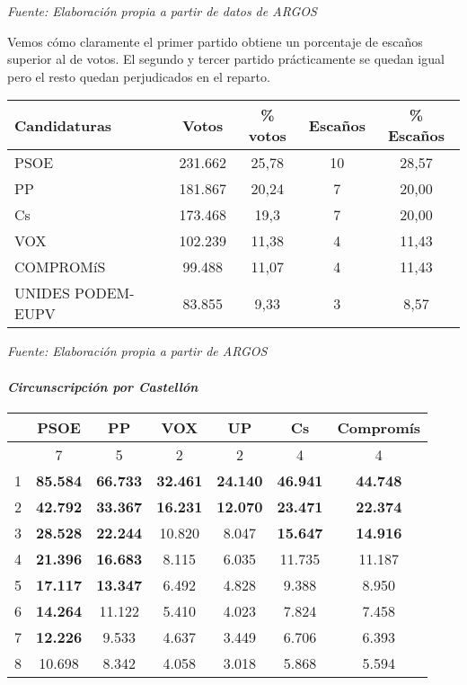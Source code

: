 \documentclass[
]{article}
\begin{document}
\emph{Fuente: Elaboración propia a partir de datos de ARGOS}

Vemos cómo claramente el primer partido obtiene un porcentaje de escaños
superior al de votos. El segundo y tercer partido prácticamente se
quedan igual pero el resto quedan perjudicados en el reparto.

\begin{longtable}[]{@{}lcccc@{}}
\toprule\noalign{}
\textbf{Candidaturas} & \textbf{Votos} & \textbf{\% votos} &
\textbf{Escaños} & \textbf{\% Escaños} \\
\midrule\noalign{}
\endhead
\bottomrule\noalign{}
\endlastfoot
PSOE & 231.662 & 25,78 & 10 & 28,57 \\
PP & 181.867 & 20,24 & 7 & 20,00 \\
Cs & 173.468 & 19,3 & 7 & 20,00 \\
VOX & 102.239 & 11,38 & 4 & 11,43 \\
COMPROMíS & 99.488 & 11,07 & 4 & 11,43 \\
UNIDES PODEM-EUPV & 83.855 & 9,33 & 3 & 8,57 \\
\end{longtable}

\emph{Fuente: Elaboración propia a partir de ARGOS}

\hypertarget{circunscripciuxf3n-por-castelluxf3n}{%
\paragraph{\texorpdfstring{\textbf{\emph{Circunscripción por
Castellón}}}{Circunscripción por Castellón}}\label{circunscripciuxf3n-por-castelluxf3n}}

\begin{longtable}[]{@{}lcccccc@{}}
\toprule\noalign{}
& \textbf{PSOE} & \textbf{PP} & \textbf{VOX} & \textbf{UP} & \textbf{Cs}
& \textbf{Compromís} \\
\midrule\noalign{}
\endhead
\bottomrule\noalign{}
\endlastfoot
24 & 7 & 5 & 2 & 2 & 4 & 4 \\
1 & \textbf{85.584} & \textbf{66.733} & \textbf{32.461} &
\textbf{24.140} & \textbf{46.941} & \textbf{44.748} \\
2 & \textbf{42.792} & \textbf{33.367} & \textbf{16.231} &
\textbf{12.070} & \textbf{23.471} & \textbf{22.374} \\
3 & \textbf{28.528} & \textbf{22.244} & 10.820 & 8.047 & \textbf{15.647}
& \textbf{14.916} \\
4 & \textbf{21.396} & \textbf{16.683} & 8.115 & 6.035 & 11.735 &
11.187 \\
5 & \textbf{17.117} & \textbf{13.347} & 6.492 & 4.828 & 9.388 & 8.950 \\
6 & \textbf{14.264} & 11.122 & 5.410 & 4.023 & 7.824 & 7.458 \\
7 & \textbf{12.226} & 9.533 & 4.637 & 3.449 & 6.706 & 6.393 \\
8 & 10.698 & 8.342 & 4.058 & 3.018 & 5.868 & 5.594 \\
\end{longtable}
\end{document}
